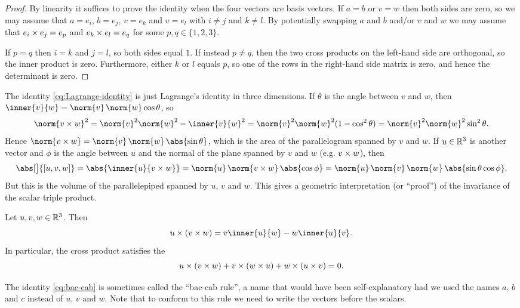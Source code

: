 \begin{proof}
    By linearity it suffices to prove the identity when the four vectors are basis vectors. If $a = b$ or $v = w$ then both sides are zero, so we may assume that $a = e_i$, $b = e_j$, $v = e_k$ and $v = e_l$ with $i \neq j$ and $k \neq l$. By potentially swapping $a$ and $b$ and/or $v$ and $w$ we may assume that $e_i \times e_j = e_p$ and $e_k \times e_l = e_q$ for some $p,q \in \{1,2,3\}$.

    If $p = q$ then $i = k$ and $j = l$, so both sides equal $1$. If instead $p \neq q$, then the two cross products on the left-hand side are orthogonal, so the inner product is zero. Furthermore, either $k$ or $l$ equals $p$, so one of the rows in the right-hand side matrix is zero, and hence the determinant is zero.
\end{proof}
%
The identity \cref{eq:Lagrange-identity} is just Lagrange's identity in three dimensions. If $\theta$ is the angle between $v$ and $w$, then $\inner{v}{w} = \norm{v} \, \norm{w} \cos\theta$, so
%
\begin{equation*}
    \norm{v \crossp w}^2
        = \norm{v}^2 \norm{w}^2 - \inner{v}{w}^2
        = \norm{v}^2 \norm{w}^2 (1 - \cos^2 \theta)
        = \norm{v}^2 \norm{w}^2 \sin^2 \theta.
\end{equation*}
%
Hence $\norm{v \crossp w} = \norm{v} \, \norm{w} \, \abs{\sin \theta}$, which is the area of the parallelogram spanned by $v$ and $w$. If $u \in \mathbb{R}^3$ is another vector and $\phi$ is the angle between $u$ and the normal of the plane spanned by $v$ and $w$ (e.g. $v \times w$), then
%
\begin{equation*}
    \abs[\big]{[u,v,w]}
        = \abs{\inner{u}{v \crossp w}}
        = \norm{u} \, \norm{v \crossp w} \, \abs{\cos\phi}
        = \norm{u} \, \norm{v} \, \norm{w} \, \abs{\sin\theta \cos\phi}.
\end{equation*}
%
But this is the volume of the parallelepiped spanned by $u$, $v$ and $w$. This gives a geometric interpretation (or \enquote{proof}) of the invariance of the scalar triple product.


\begin{corollary}
    \label{cor:vector-triple-product}
    Let $u,v,w \in \mathbb{R}^3$. Then
    \begin{equation}
        \label{eq:bac-cab}
        u \crossp (v \crossp w)
            = v\inner{u}{w} - w\inner{u}{v}.
    \end{equation}
    In particular, the cross product satisfies the 
    \begin{equation}
        \label{eq:cross-product-Jacobi}
        u \times (v \times w)
            + v \times (w \times u)
            + w \times (u \times v)
            = 0.
    \end{equation}
\end{corollary}
%
The identity \cref{eq:bac-cab} is sometimes called the \enquote{bac-cab rule}, a name that would have been self-explanatory had we used the names $a$, $b$ and $c$ instead of $u$, $v$ and $w$. Note that to conform to this rule we need to write the vectors before the scalars.

